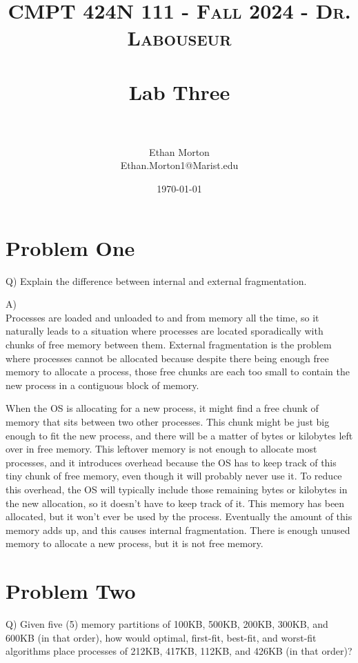 \documentclass[letterpaper, 10pt,DIV=13]{scrartcl}
\title{	
   \normalfont \normalsize 
   \textsc{CMPT 424N 111 - Fall 2024 - Dr. Labouseur} \\[10pt] %
   \horrule{0.5pt} \\[0.25cm] 	%
   \huge Lab Three  \\     	    %
   \horrule{0.5pt} \\[0.25cm] 	%
}
\author{Ethan Morton \\ \normalsize Ethan.Morton1@Marist.edu}
\date{\normalsize\today} 	%
\numberwithin{equation}{section} %
\numberwithin{figure}{section} %
\numberwithin{table}{section} %
\begin{document}
\maketitle %

\section{Problem One}
Q) Explain the difference between internal and external fragmentation.

A)\\
Processes are loaded and unloaded to and from memory all the time, so it naturally leads to a situation where processes are located sporadically with chunks of free memory between them. External fragmentation is the problem where processes cannot be allocated because despite there being enough free memory to allocate a process, those free chunks are each too small to contain the new process in a contiguous block of memory.

When the OS is allocating for a new process, it might find a free chunk of memory that sits between two other processes. This chunk might be just big enough to fit the new process, and there will be a matter of bytes or kilobytes left over in free memory. This leftover memory is not enough to allocate most processes, and it introduces overhead because the OS has to keep track of this tiny chunk of free memory, even though it will probably never use it. To reduce this overhead, the OS will typically include those remaining bytes or kilobytes in the new allocation, so it doesn't have to keep track of it. This memory has been allocated, but it won't ever be used by the process. Eventually the amount of this memory adds up, and this causes internal fragmentation. There is enough unused memory to allocate a new process, but it is not free memory.

\section{Problem Two}
Q) Given five (5) memory partitions of 100KB, 500KB, 200KB, 300KB, and 600KB (in that
order), how would optimal, first-fit, best-fit, and worst-fit algorithms place processes
of 212KB, 417KB, 112KB, and 426KB (in that order)?
\end{document}
